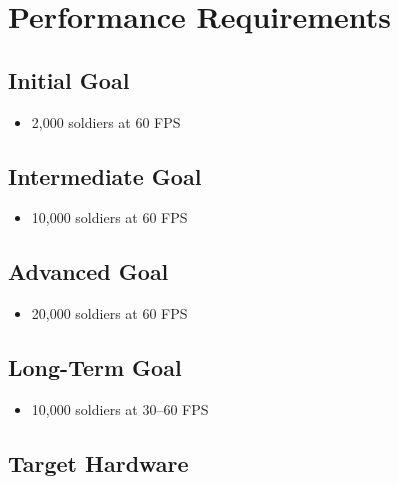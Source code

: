 \documentclass[11pt,a4paper]{article}
\begin{document}
\section{Performance Requirements}

\subsection{Initial Goal}

\begin{itemize}

    \item 2,000 soldiers at 60 FPS

\end{itemize}

\subsection{Intermediate Goal}

\begin{itemize}

    \item 10,000 soldiers at 60 FPS

\end{itemize}

\subsection{Advanced Goal}

\begin{itemize}

    \item 20,000 soldiers at 60 FPS

\end{itemize}

\subsection{Long-Term Goal}

\begin{itemize}

    \item 10,000 soldiers at 30--60 FPS

\end{itemize}

\subsection{Target Hardware}
\end{document}
